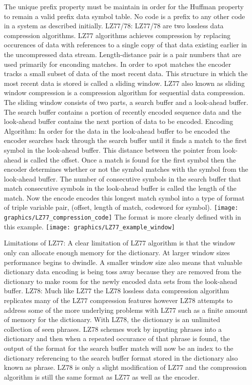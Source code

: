 \documentclass[letterpaper, 12pt]{article}
\begin{document}
	The unique prefix property must be maintain in order for the Huffman property to remain a valid prefix
	data symbol table. No code is a prefix to any other code in a system as described initially.
LZ77/78:
	LZ77/78 are two lossless data compression algorithms. LZ77 algorithms achieves compression by replacing 
	occurences of data with references to a single copy of that data existing earlier in the uncompressed
	data stream. Length-distance pair is a pair numbers that are used primarily for enconding matches. In order
	to spot matches the encoder tracks a small subset of data of the most recent data. This structure in which
	the most recent data is stored is called a sliding window. LZ77 also known as sliding window compression is
	a compression algorithm for sequential data compression. The sliding window consists of two parts, a search
	buffer and a look-ahead buffer. The search buffer contains a portion of recently encoded sequence data and
	the look-ahead buffer contains the next portion of data to be encoded. 
	Encoding Algorithm:
	In order for the data in the look-ahead buffer to be encoded the encoder searches back through the 
	search buffer until it finds a match to the first symbol in the look-ahead buffer. This distance between 
	the pointer from look-ahead is called the offset. Once a match is found for the first symbol then the encoder
	determines whether or not the symbol matches with the symbol from the look-ahead buffer. The number of 
	consecutive symbols in the search buffer that match consecutive symbols in the look-ahead buffer is called
	the length of the match. Now the encode encodes this longest match symbol into a type of format of triple
	variable pair, (offset, length of match, codeword for symbol).
	\texttt{[image: graphics/LZ77\_compression\_code]}
	The format is more clearly defined with in this example.
	\texttt{[image: graphics/LZ77\_example\_window]}
	
	Limitations of LZ77:
	A clear limitation of LZ77 algorithm is that the window only can allocate enough memory for the dictionary. At
	larger window sizes performance begins to dwindle. A smaller window size also means that valuable dictionary data
	encoding is being toss away because they are removed from the dictionary to make room for the newly encoded data sets
	from the look-ahead buffer. 
LZ78:
	Much like LZ77 the LZ78 lossless data compression algorithm replicates many of the LZ77 compression features however
	LZ78 attempts to address some of the more underlying problems with LZ77 such as a finite amount of memory for 
	the dictionary. With LZ78, the dictionary is an unlimited collection of seen phrases. LZ78 schemes work by inputing 
	phrases into a dictionary and then when a repeated occurance of that phrase is found, the output of the format for 
	the search buffer match will now be an index to the dictionary referencing to the search buffer format stored in
	the dictionary also known as phrase. LZ78 is only a slight modification of LZ77 and the compression algorithm is still
	the same format as LZ77 as well as the encoder. 
\end{document}
